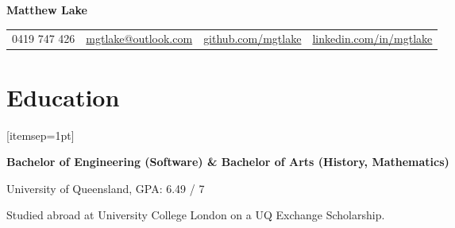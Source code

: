 \documentclass[a4paper]{article}
\def\name{Matthew Lake}
\renewenvironment{itemize}{
  \begin{list}{}{
    \setlength{\leftmargin}{1.5em}
  }
}{
  \end{list}
}
\newcommand{\dateitem}[1] {\item[\textbf{#1 :}]}
\newcommand{\accentcolour}{\color{NavyBlue}}
\newcommand{\resumesection}[1]{\section*{\accentcolour #1}}
\begin{document}
\centerline{\rmfamily \accentcolour \Huge \bfseries \name}
\vspace{-0.5\baselineskip}

\begin{center}

	\begin{tabular}{c  c c c}
		{\color{NavyBlue}\faPhone\space} 0419 747 426 & 
		{\color{NavyBlue}\faEnvelope\space} \href{mailto:mgtlake@outlook.com}{mgtlake@outlook.com} & 
		{\color{NavyBlue}\faGithub\space} \href{github.com/matthew-lake}{github.com/mgtlake} & 
		{\color{NavyBlue}\faLinkedinSquare\space} \href{linkedin.com/in/mgtlake}{linkedin.com/in/mgtlake}
	\end{tabular}
\end{center}

\resumesection{Education}
\begin{itemize}[itemsep=1pt]
	\dateitem{2014 -- 2019} {\textbf{Bachelor of Engineering (Software) \&
			Bachelor of Arts (History, Mathematics)}
		
		University of Queensland, GPA: 6.49 / 7
		
		\dateitem{2017} Studied abroad at University College London on a UQ Exchange Scholarship.
	}
\end{itemize}

\end{document}
